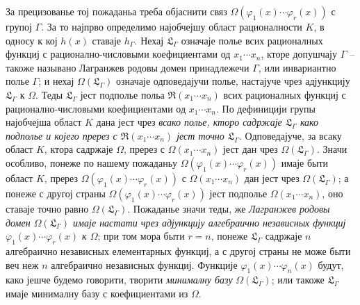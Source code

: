 ﻿\documentclass[11pt]{article}
\begin{document}
За прецизованье тој пожаданьа треба објаснити связ $\Omega(\varphi_1(x)\cdots\varphi_r(x))$ с групој $\Gamma$. За то најпрво определимо најобчејшу област рационалности $K$, в односу к кој $h(x)$ ставаје $h_\Gamma$. Нехај $\mathfrak L_\Gamma$ означаје полье всих рационалных функциј с рационално-числовыми коефициентами од $x_1\cdots x_n$, кторе допушчају $\Gamma$ -- такоже называно Лагранжев родовы домен принадлежечи $\Gamma$, или инвариантно полье $\Gamma$; и нехај $\Omega(\mathfrak L_\Gamma)$ означаје одповедајучи полье, настајуче чрез адјункцију $\mathfrak L_\Gamma$ к $\Omega$. Теды $\mathfrak L_\Gamma$ јест подполье польа $\mathfrak R(x_1\cdots x_n)$ всих рационалных функциј с рационално-числовыми коефициентами од $x_1\cdots x_n$. По дефиницији групы најобчејша област $K$ дана јест чрез {\itshape всако полье, кторо садржаје $\mathfrak L_\Gamma$ како подполье и којего пререз с $\mathfrak R(x_1\cdots x_n)$ јест точно $\mathfrak L_\Gamma$}. Одповедајуче, за всаку област $K$, ктора садржаје $\Omega$, пререз с $\Omega(x_1\cdots x_n)$ јест дан чрез $\Omega(\mathfrak L_\Gamma)$. Значи особливо, понеже по нашему пожаданьу $\Omega(\varphi_1(x)\cdots\varphi_r(x))$ имаје быти област $K$, пререз $\Omega(\varphi_1(x)\cdots\varphi_r(x))$ с $\Omega(x_1\cdots x_n)$ дан јест чрез $\Omega(\mathfrak L_\Gamma)$; а понеже с другој страны $\Omega(\varphi_1(x)\cdots\varphi_r(x))$ јест подполье $\Omega(x_1\cdots x_n)$, оно ставаје точно равно $\Omega(\mathfrak L_\Gamma)$. Пожаданье значи теды, же {\itshape Лагранжев родовы домен $\Omega(\mathfrak L_\Gamma)$ имаје настати чрез адјункцију алгебраично независных функциј $\varphi_1(x)\cdots\varphi_r(x)$ к $\Omega$}; при том мора быти $r=n$, понеже $\mathfrak L_\Gamma$ садржаје $n$ алгебраично независных елементарных функциј, а с другој страны не може быти веч неж $n$ алгебраично независных функциј. Функције $\varphi_1(x)\cdots\varphi_n(x)$ будут, како јешче будемо говорити, творити {\itshape минималну базу} $\Omega(\mathfrak L_\Gamma)$; или такоже $\mathfrak L_\Gamma$ имаје минималну базу с коефициентами из $\Omega$.
\end{document}

